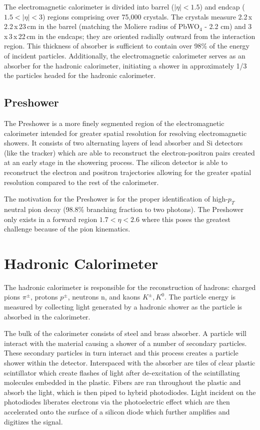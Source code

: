 The electromagnetic calorimeter is divided into barrel ($|\eta|<1.5$) and endcap ($1.5<|\eta|<3$) regions comprising over 75,000 crystals. The crystals measure 2.2$\,$x$\,$2.2$\,$x$\,$23$\,$cm in the barrel (matching the Moliere radius of PbWO$_{4}$ - 2.2 cm) and 3$\,$x$\,$3$\,$x$\,$22$\,$cm in the endcaps; they are oriented radially outward from the interaction region. This thickness of absorber is sufficient to contain over 98\% of the energy of incident particles. Additionally, the electromagnetic calorimeter serves as an absorber for the hadronic calorimeter, initiating a shower in approximately 1/3 the particles headed for the hadronic calorimeter.

\subsection{Preshower}

The Preshower is a more finely segmented region of the electromagnetic calorimeter intended for greater spatial resolution for resolving electromagnetic showers. It consists of two alternating layers of lead absorber and Si detectors (like the tracker) which are able to reconstruct the electron-positron pairs created at an early stage in the showering process. The silicon detector is able to reconstruct the electron and positron trajectories allowing for the greater spatial resolution compared to the rest of the calorimeter.

The motivation for the Preshower is for the proper identification of high-$p_{T}$ neutral pion decay (98.8\% branching fraction to two photons). The Preshower only exists in a forward region $1.7<\eta<2.6$ where this poses the greatest challenge because of the pion kinematics.

\section{Hadronic Calorimeter}

The hadronic calorimeter is responsible for the reconstruction of hadrons: charged pions $\pi^{\pm}$, protons $p^{\pm}$, neutrons n, and kaons $K^{\pm}, K^{0}$. The particle energy is measured by collecting light generated by a hadronic shower as the particle is absorbed in the calorimeter.\cite{hcaltdr}

The bulk of the calorimeter consists of steel and brass absorber. A particle will interact with the material causing a shower of a number of secondary particles. These secondary particles in turn interact and this process creates a particle shower within the detector. Interspaced with the absorber are tiles of clear plastic scintillator which create flashes of light after de-excitation of the scintillating molecules embedded in the plastic. Fibers are ran throughout the plastic and absorb the light, which is then piped to hybrid photodiodes. Light incident on the photodiodes liberates electrons via the photoelectric effect which are then accelerated onto the surface of a silicon diode which further amplifies and digitizes the signal.

